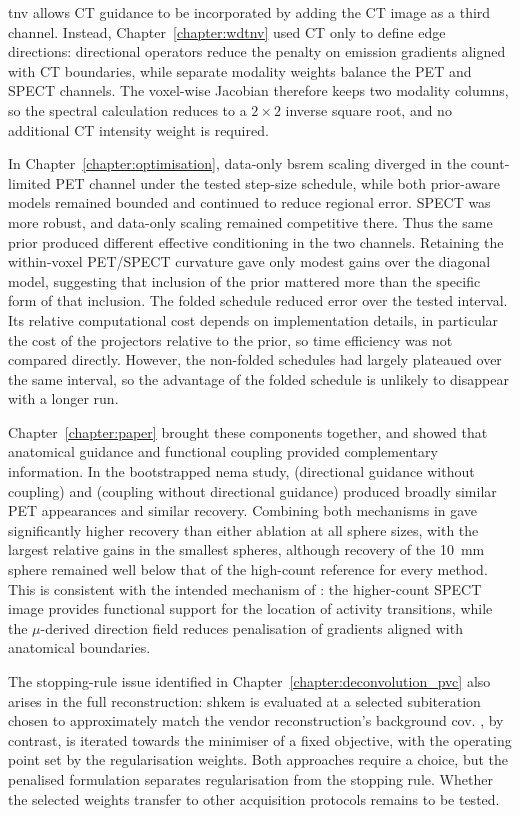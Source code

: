 \gls{tnv} allows CT guidance to be incorporated by adding the CT image as a third channel. Instead, Chapter~\ref{chapter:wdtnv} used CT only to define edge directions: directional operators reduce the penalty on emission gradients aligned with CT boundaries, while separate modality weights balance the PET and SPECT channels. The voxel-wise Jacobian therefore keeps two modality columns, so the spectral calculation reduces to a $2\times2$ inverse square root, and no additional CT intensity weight is required.

In Chapter~\ref{chapter:optimisation}, data-only \gls{bsrem} scaling diverged in the count-limited PET channel under the tested step-size schedule, while both prior-aware models remained bounded and continued to reduce regional error. SPECT was more robust, and data-only scaling remained competitive there. Thus the same prior produced different effective conditioning in the two channels. Retaining the within-voxel PET/SPECT curvature gave only modest gains over the diagonal model, suggesting that inclusion of the prior mattered more than the specific form of that inclusion. The folded schedule reduced error over the tested interval. Its relative computational cost depends on implementation details, in particular the cost of the projectors relative to the prior, so time efficiency was not compared directly. However, the non-folded schedules had largely plateaued over the same interval, so the advantage of the folded schedule is unlikely to disappear with a longer run.

Chapter~\ref{chapter:paper} brought these components together, and showed that anatomical guidance and functional coupling provided complementary information. In the bootstrapped \gls{nema} study, \dtv{} (directional guidance without coupling) and \wtnv{} (coupling without directional guidance) produced broadly similar PET appearances and similar recovery. Combining both mechanisms in \wdtnv{} gave significantly higher recovery than either ablation at all sphere sizes, with the largest relative gains in the smallest spheres, although recovery of the \SI{10}{\milli\metre} sphere remained well below that of the high-count reference for every method. This is consistent with the intended mechanism of \wdtnv: the higher-count SPECT image provides functional support for the location of activity transitions, while the $\mu$-derived direction field reduces penalisation of gradients aligned with anatomical boundaries.

The stopping-rule issue identified in Chapter~\ref{chapter:deconvolution_pvc} also arises in the full reconstruction: \gls{shkem} is evaluated at a selected subiteration chosen to approximately match the vendor reconstruction's background \gls{cov}. \wdtnv{}, by contrast, is iterated towards the minimiser of a fixed objective, with the operating point set by the regularisation weights. Both approaches require a choice, but the penalised formulation separates regularisation from the stopping rule. Whether the selected weights transfer to other acquisition protocols remains to be tested.

